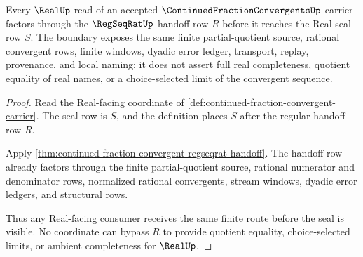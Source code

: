 \begin{theorem}
\label{thm:continued-fraction-convergent-real-seal-boundary}
Every $\RealUp$ read of an accepted $\ContinuedFractionConvergentsUp$ carrier
factors through the $\RegSeqRatUp$ handoff row $R$ before it reaches the Real
seal row $S$. The boundary exposes the same finite partial-quotient source,
rational convergent rows, finite windows, dyadic error ledger, transport,
replay, provenance, and local naming; it does not assert full real
completeness, quotient equality of real names, or a choice-selected limit of
the convergent sequence.
\end{theorem}
\begin{proof}
Read the Real-facing coordinate of
\autoref{def:continued-fraction-convergent-carrier}. The seal row is $S$, and
the definition places $S$ after the regular handoff row $R$.

Apply \autoref{thm:continued-fraction-convergent-regseqrat-handoff}. The
handoff row already factors through the finite partial-quotient source,
rational numerator and denominator rows, normalized rational convergents,
stream windows, dyadic error ledgers, and structural rows.

Thus any Real-facing consumer receives the same finite route before the seal
is visible. No coordinate can bypass $R$ to provide quotient equality,
choice-selected limits, or ambient completeness for $\RealUp$.
\end{proof}


\begin{closurestatus}{\ContinuedFractionConvergentsUp}
  \theoryclosure{\seedClosure}
  \formalstatus{\unformalizedV}
\end{closurestatus}
